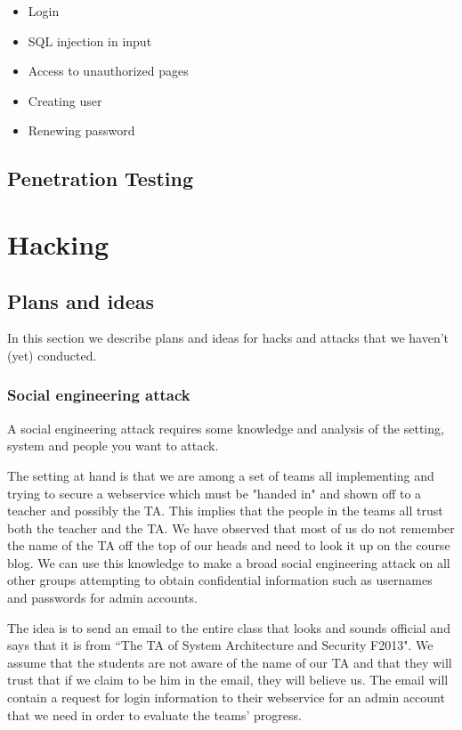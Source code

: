 \documentclass[a4paper]{article}
\begin{document}
\begin{itemize}
\item Login
\item SQL injection in input
\item Access to unauthorized pages
\item Creating user
\item Renewing password
\end{itemize}

\subsection{Penetration Testing}

\section{Hacking}
\subsection{Plans and ideas}
In this section we describe plans and ideas for hacks and attacks that we haven't (yet) conducted.
\subsubsection{Social engineering attack}
A social engineering attack requires some knowledge and analysis of the setting, system and people you want to attack.

The setting at hand is that we are among a set of teams all implementing and trying to secure a webservice which must be "handed in" and shown off to a teacher and possibly the TA. This implies that the people in the teams all trust both the teacher and the TA. We have observed that most of us do not remember the name of the TA off the top of our heads and need to look it up on the course blog.
We can use this knowledge to make a broad social engineering attack on all other groups attempting to obtain confidential information such as usernames and passwords for admin accounts.

The idea is to send an email to the entire class that looks and sounds official and says that it is from ``The TA of System Architecture and Security F2013". We assume that the students are not aware of the name of our TA and that they will trust that if we claim to be him in the email, they will believe us. The email will contain a request for login information to their webservice for an admin account that we need in order to evaluate the teams' progress.
\end{document}
